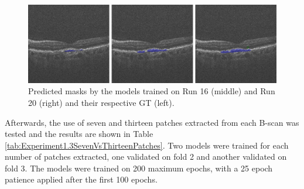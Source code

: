 \begin{figure}[!ht]
	\centering
	\includegraphics[width=1.0\linewidth]{figures/VerticalPatchesSegmentationTopcon.png}
	\caption{Predicted masks by the models trained on Run 16 (middle) and Run 20 (right) and their respective GT (left).}
	\label{fig:VerticalPatchesSegmentationTopcon}
\end{figure}

Afterwards, the use of seven and thirteen patches extracted from each B-scan was tested and the results are shown in Table \ref{tab:Experiment1.3SevenVsThirteenPatches}. Two models were trained for each number of patches extracted, one validated on fold 2 and another validated on fold 3. The models were trained on 200 maximum epochs, with a 25 epoch patience applied after the first 100 epochs.

